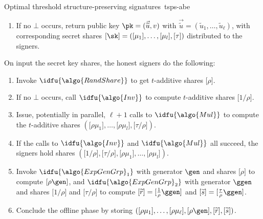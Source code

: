 \begin{protocolbox}{Optimal threshold structure-preserving
  signatures~\cite{C:AGHO11}}{tsps-abe}
\begin{description}
\begin{enumerate}
      \item If no $\bot$ occurs, return public key $\pk = (\vec{\widetilde{u}},
        {v})$ with $\vec{\widetilde{u}} = (\widetilde{u}_1, \ldots,
        \widetilde{u}_\ell)$, with corresponding secret shares $\lbrack
        \sk\rbrack  = (\lbrack \mu_1\rbrack , \ldots, \lbrack \mu_l\rbrack ,
        \lbrack \tau\rbrack )$ distributed to the signers.

    \end{enumerate}

  \item[$\lbrack \signature\rbrack _{\algo{OffSign}} \sample
    \algo{OffSign}(\lbrack \sk\rbrack )$ :] On input the secret key shares, the
    honest signers do the following:

    \begin{enumerate}

      \item Invoke $\idfu{\algo{RandShare}}$ to get $t$-additive shares
        $\lbrack \rho\rbrack $.

      \item If no $\bot$ occurs, call $\idfu{\algo{Inv}}$ to compute
        $t$-additive shares $\lbrack 1/\rho\rbrack $.

      \item Issue, potentially in parallel, $\ell+1$ calls to
        $\idfu{\algo{Mul}}$ to compute the $t$-additive shares $(\lbrack
        \rho\mu_1\rbrack , \ldots,\lbrack \rho\mu_l\rbrack , \lbrack
        \tau/\rho\rbrack )$.

      \item If the calls to $\idfu{\algo{Inv}}$ and $\idfu{\algo{Mul}}$ all
        succeed, the signers hold shares $(\lbrack 1/\rho\rbrack , \lbrack
        \tau/\rho\rbrack , \lbrack \rho\mu_1\rbrack , \ldots, \lbrack
        \rho\mu_l\rbrack )$.

      \item Invoke $\idfu{\algo{ExpGenGrp}_1}$ with generator $\gen$ and shares
        $\lbrack \rho\rbrack $ to compute $\lbrack \rho\gen\rbrack $, and
        $\idfu{\algo{ExpGenGrp}_2}$ with generator $\ggen$ and shares $\lbrack
        1/\rho\rbrack $ and $\lbrack \tau/\rho\rbrack $ to compute $\lbrack
        \widetilde{r}\rbrack  = \lbrack \tfrac{1}{\rho}\ggen\rbrack $ and
        $\lbrack \widetilde{s}\rbrack  = \lbrack \tfrac{\tau}{\rho}\ggen\rbrack
        $.

      \item Conclude the offline phase by storing $(\lbrack \rho\mu_1\rbrack ,
        \ldots, \lbrack \rho\mu_\ell\rbrack , \lbrack \rho\gen\rbrack , \lbrack
        \widetilde{r}\rbrack , \lbrack \widetilde{s}\rbrack )$.


\end{enumerate}
\end{description}
\end{protocolbox}
